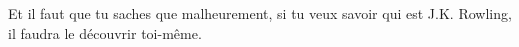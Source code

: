 Et il faut que tu saches que malheurement, si tu veux savoir qui est J.K. Rowling, il faudra le découvrir toi-même.

